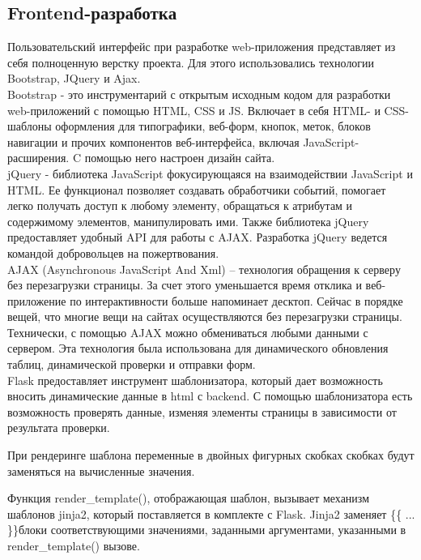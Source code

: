 \subsection{Frontend-разработка}%
\setcounter{subsection}{4}

Пользовательский интерфейс при разработке web-приложения представляет из себя полноценную верстку проекта. Для этого использовались технологии Bootstrap, JQuery и Ajax. \\

Bootstrap - это инструментарий с открытым исходным кодом для разработки web-приложений с помощью HTML, CSS и JS. Включает в себя HTML- и CSS-шаблоны оформления для типографики, веб-форм, кнопок, меток, блоков навигации и прочих компонентов веб-интерфейса, включая JavaScript-расширения. C помощью него настроен дизайн сайта.  \cite{3} \\

jQuery - библиотека JavaScript фокусирующаяся на взаимодействии JavaScript и HTML. Ее функционал позволяет создавать обработчики событий, помогает легко получать доступ к любому элементу, обращаться к атрибутам и содержимому элементов, манипулировать ими. Также библиотека jQuery предоставляет удобный API для работы с AJAX. Разработка jQuery ведется командой добровольцев на пожертвования. \cite{4} \\

AJAX (Asynchronous JavaScript And Xml) – технология обращения к серверу без перезагрузки страницы. За счет этого уменьшается время отклика и веб-приложение по интерактивности больше напоминает десктоп. Сейчас в порядке вещей, что многие вещи на сайтах осуществляются без перезагрузки страницы. Технически, с помощью AJAX можно обмениваться любыми данными с сервером. Эта технология была использована для динамического обновления таблиц, динамической проверки и отправки форм.  \cite{5} \\

Flask предоставляет инструмент шаблонизатора, который дает возможность вносить динамические данные в html с backend. С помощью шаблонизатора есть возможность проверять данные, изменяя элементы страницы в зависимости от результата проверки.

При рендеринге шаблона переменные в двойных фигурных скобках скобках будут заменяться на вычисленные значения.

Функция render\_template(), отображающая шаблон, вызывает механизм шаблонов jinja2, который поставляется в комплекте с Flask. Jinja2 заменяет \{\{ ... \}\}блоки соответствующими значениями, заданными аргументами, указанными в render\_template() вызове. 

